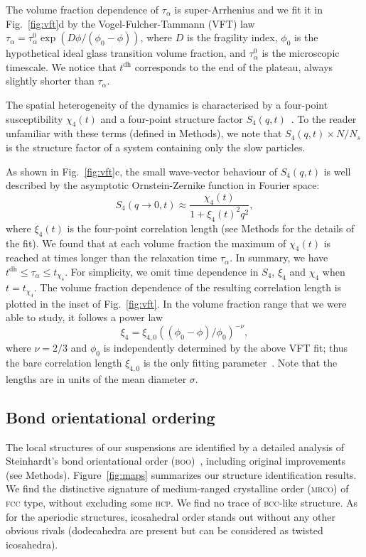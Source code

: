 The volume fraction dependence of $\tau_\alpha$ is super-Arrhenius and we fit it in Fig.~\ref{fig:vft}d by the Vogel-Fulcher-Tammann (VFT) law $\tau_\alpha=\tau_\alpha^0 \exp(D\phi/(\phi_0-\phi))$, where $D$ is the fragility index, $\phi_0$ is the hypothetical ideal glass transition volume fraction, and $\tau_\alpha^0$ is the microscopic timescale.  We notice that $t^\text{dh}$ corresponds to the end of the plateau, always slightly shorter than $\tau_\alpha$.

The spatial heterogeneity of the dynamics is characterised by a four-point susceptibility $\chi_4(t)$ and a four-point structure factor $S_4(q,t)$~\cite{Flenner2011}. To the reader unfamiliar with these terms (defined in Methods), we note that $S_4(q,t)\times N/N_s$ is the structure factor of a system containing only the slow particles.

As shown in Fig.~\ref{fig:vft}c, the small wave-vector behaviour of $S_4(q,t)$ is well described by the asymptotic Ornstein-Zernike function in Fourier space:
\begin{equation}
	S_4(q\rightarrow 0,t) \approx \frac{\chi_4(t)}{1+\xi_4(t)^2 q^2},
	\label{eq:OZ_Fourier}
\end{equation}
where $\xi_4(t)$ is the four-point correlation length (see Methods for the details of the fit). We found that at each volume fraction the maximum of $\chi_4(t)$ is reached at times longer than the relaxation time $\tau_\alpha$. In summary, we have
$t^\text{dh} \leq \tau_\alpha \leq t_{\chi_4}$.
For simplicity, we omit time dependence in $S_4$, $\xi_4$ and $\chi_4$ when $t=t_{\chi_4}$. The volume fraction dependence of the resulting correlation length is plotted in the inset of Fig.~\ref{fig:vft}. In the volume fraction range that we were able to study, it follows a power law
\begin{equation}
\xi_{4} =\xi_{4,0} ((\phi_0-\phi)/\phi_0)^{-\nu},
\label{eq:xi4ofphi}
\end{equation}
where $\nu=2/3$ and $\phi_0$ is independently determined by the above VFT fit; thus the bare correlation length $\xi_{4,0}$ is the only fitting parameter~\citep{tanaka2010critical}. Note that the lengths are in units of the mean diameter $\sigma$.


\subsection*{Bond orientational ordering}

The local structures of our suspensions are identified by a detailed analysis of Steinhardt's bond orientational order (\textsc{boo})~\citep{steinhardt1983boo}, including original improvements (see Methods). Figure~\ref{fig:maps} summarizes our structure identification results. We find the distinctive signature of medium-ranged crystalline order (\textsc{mrco}) of \textsc{fcc} type, without excluding some \textsc{hcp}. We find no trace of \textsc{bcc}-like structure. As for the aperiodic structures, icosahedral order stands out without any other obvious rivals (dodecahedra are present but can be considered as twisted icosahedra).


